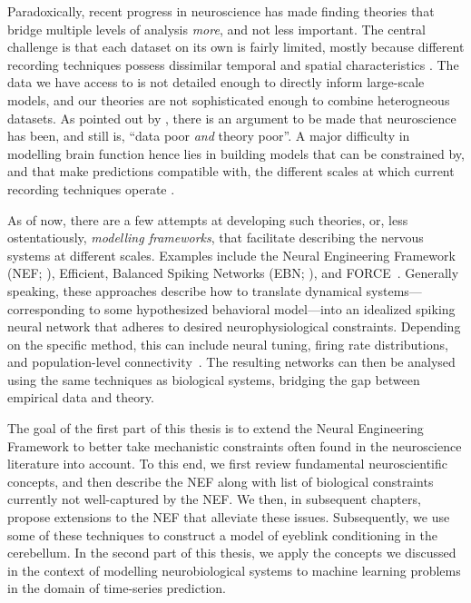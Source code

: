 Paradoxically, recent progress in neuroscience has made finding theories that bridge multiple levels of analysis \emph{more}, and not less important.
The central challenge is that each dataset on its own is fairly limited, mostly because different recording techniques possess dissimilar temporal and spatial characteristics \citep{sejnowski2014putting}.
The data we have access to is not detailed enough to directly inform large-scale models, and our theories are not sophisticated enough to combine heterogneous datasets. As pointed out by \citet{churchland1992computational}, there is an argument to be made that neuroscience has been, and still is, \enquote{data poor \emph{and} theory poor}.
A major difficulty in modelling brain function hence lies in building models that can be constrained by, and that make predictions compatible with, the different scales at which current recording techniques operate \citep[Chapter~9]{eliasmith2013how}.

As of now, there are a few attempts at developing such theories, or, less ostentatiously, \emph{modelling frameworks}, that facilitate describing the nervous systems at different scales.
Examples include the Neural Engineering Framework (NEF; \cite{eliasmith2003neural}), Efficient, Balanced Spiking Networks (EBN; \cite{boerlin2011spikebased,boerlin2013predictive}), and FORCE~\citep{sussillo2009generating,nicola2017supervised}.
Generally speaking, these approaches describe how to translate dynamical systems---corresponding to some hypothesized behavioral model---into an idealized spiking neural network that adheres to desired neurophysiological constraints.
Depending on the specific method, this can include neural tuning, firing rate distributions, and population-level connectivity~\citep{komer2016unified,nicola2017supervised}.
The resulting networks can then be analysed using the same techniques as biological systems, bridging the gap between empirical data and theory.

The goal of the first part of this thesis is to extend the Neural Engineering Framework to better take mechanistic constraints often found in the neuroscience literature into account.
To this end, we first review fundamental neuroscientific concepts, and then describe the NEF along with list of biological constraints currently not well-captured by the NEF.
We then, in subsequent chapters, propose extensions to the NEF that alleviate these issues.
Subsequently, we use some of these techniques to construct a model of eyeblink conditioning in the cerebellum.
In the second part of this thesis, we apply the concepts we discussed in the context of modelling neurobiological systems to machine learning problems in the domain of time-series prediction.
